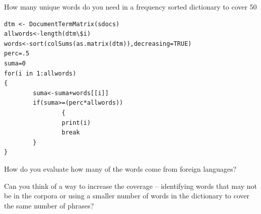 \documentclass{article}
\begin{document}
How many unique words do you need in a frequency sorted dictionary to cover 50%

\begin{lstlisting}
dtm <- DocumentTermMatrix(sdocs)
allwords<-length(dtm\$i)
words<-sort(colSums(as.matrix(dtm)),decreasing=TRUE)
perc=.5
suma=0
for(i in 1:allwords)
{
        suma<-suma+words[[i]]
        if(suma>=(perc*allwords))
                {
                print(i)
                break
        }
}
\end{lstlisting}

How do you evaluate how many of the words come from foreign languages? 

Can you think of a way to increase the coverage -- identifying words that may not be in the corpora or using a smaller number of words in the dictionary to cover the same number of phrases?
\end{document}
